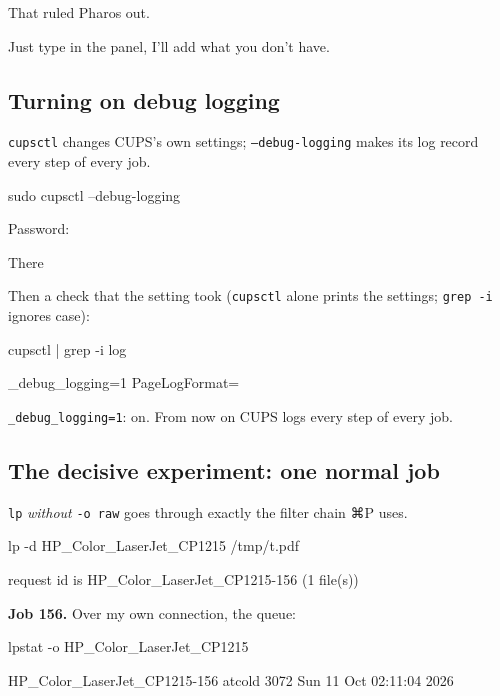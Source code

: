 \documentclass[11pt,a4paper]{article}
\begin{document}
That ruled Pharos out.

\begin{alf}
Just type in the panel, I'll add what you don't have.
\end{alf}

\subsection{Turning on debug logging}\label{sec:debug}

\texttt{cupsctl} changes CUPS's own settings; \texttt{--debug-logging} makes its log record every step of every job.

\begin{pane}
sudo cupsctl --debug-logging
\end{pane}
\begin{cmdout}
Password:
\end{cmdout}
\begin{alf}
There
\end{alf}

Then a check that the setting took (\texttt{cupsctl} alone prints the settings; \texttt{grep -i} ignores case):

\begin{pane}
cupsctl | grep -i log
\end{pane}
\begin{cmdout}
_debug_logging=1
PageLogFormat=
\end{cmdout}

\texttt{\_debug\_logging=1}: on. From now on CUPS logs every step of every job.

\subsection{The decisive experiment: one normal job}\label{sec:decisive}

\texttt{lp} \emph{without} \texttt{-o raw} goes through exactly the filter chain ⌘P uses.

\begin{pane}
lp -d HP_Color_LaserJet_CP1215 /tmp/t.pdf
\end{pane}
\begin{cmdout}
request id is HP_Color_LaserJet_CP1215-156 (1 file(s))
\end{cmdout}
\textbf{Job 156.} Over my own connection, the queue:

\begin{mine}
lpstat -o HP_Color_LaserJet_CP1215
\end{mine}
\begin{cmdout}
HP_Color_LaserJet_CP1215-156 atcold            3072   Sun 11 Oct 02:11:04 2026
\end{cmdout}
\end{document}
